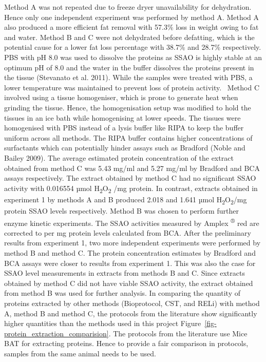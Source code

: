\documentclass[
  letterpaper,
  DIV=11,
  numbers=noendperiod]{scrreprt}
\begin{document}
Method A was not repeated due to freeze dryer unavailability for
dehydration. Hence only one independent experiment was performed by
method A. Method A also produced a more efficient fat removal with
57.3\% loss in weight owing to fat and water. Method B and C were not
dehydrated before defatting, which is the potential cause for a lower
fat loss percentage with 38.7\% and 28.7\% respectively. PBS with pH 8.0
was used to dissolve the proteins as SSAO is highly stable at an optimum
pH of 8.0 and the water in the buffer dissolves the proteins present in
the tissue (Stevanato et al. 2011). While the samples were treated with
PBS, a lower temperature was maintained to prevent loss of protein
activity.~ Method C involved using a tissue homogeniser, which is prone
to generate heat when grinding the tissue. Hence, the homogenisation
setup was modified to hold the tissues in an ice bath while homogenising
at lower speeds. The tissues were homogenised with PBS instead of a
lysis buffer like RIPA to keep the buffer uniform across all methods.
The RIPA buffer contains higher concentrations of surfactants which can
potentially hinder assays such as Bradford (Noble and Bailey 2009). The
average estimated protein concentration of the extract obtained from
method C was 5.43 mg/ml and 5.27 mg/ml by Bradford and BCA assays
respectively. The extract obtained by method C had no significant SSAO
activity with 0.016554 µmol H\textsubscript{2}O\textsubscript{2} /mg
protein. In contrast, extracts obtained in experiment 1 by methods A and
B produced 2.018 and 1.641 µmol H\textsubscript{2}O\textsubscript{2}/mg
protein SSAO levels respectively. Method B was chosen to perform further
enzyme kinetic experiments. The SSAO activities measured by Amplex
\textsuperscript{®} red are corrected to per mg protein levels
calculated from BCA. After the preliminary results from experiment 1,
two more independent experiments were performed by method B and method
C. The protein concentration estimates by Bradford and BCA assays were
closer to results from experiment 1. This was also the case for SSAO
level measurements in extracts from methods B and C. Since extracts
obtained by method C did not have viable SSAO activity, the extract
obtained from method B was used for further analysis. In comparing the
quantity of proteins extracted by other methods (Bioprotocol, CST, and
RELi) with method A, method B and method C, the protocols from the
literature show significantly higher quantities than the methods used in
this project Figure~\ref{fig-protein_extraction_comparision}. The
protocols from the literature use Mice BAT for extracting proteins.
Hence to provide a fair comparison in protocols, samples from the same
animal needs to be used.
\end{document}
